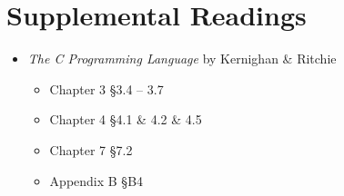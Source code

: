 \section{Supplemental Readings}

\begin{itemize}
  \item \emph{The C Programming Language} by Kernighan \& Ritchie
    \begin{itemize}
      \item Chapter 3 \S 3.4 -- 3.7
      \item Chapter 4 \S 4.1 \& 4.2 \& 4.5
      \item Chapter 7 \S 7.2
      \item Appendix B \S B4
    \end{itemize}
\end{itemize}
